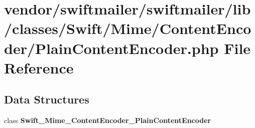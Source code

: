 \section{vendor/swiftmailer/swiftmailer/lib/classes/\+Swift/\+Mime/\+Content\+Encoder/\+Plain\+Content\+Encoder.php File Reference}
\label{_plain_content_encoder_8php}
\subsection*{Data Structures}
\begin{DoxyCompactItemize}
\item 
class {\bf Swift\+\_\+\+Mime\+\_\+\+Content\+Encoder\+\_\+\+Plain\+Content\+Encoder}
\end{DoxyCompactItemize}
